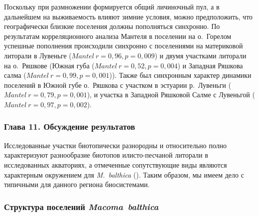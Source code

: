 {Поскольку при размножении формируется общий личиночный пул, а в дальнейшем на выживаемость влияют зимние условия, можно предположить, что географически близкие поселения должны пополняться синхронно.
По результатам корреляционного анализа Мантеля в поселении на о.~Горелом успешные пополнения происходили синхронно с поселениями на материковой литорали в Лувеньге ($Mantel\ r = 0,96, p = 0,009$) и двумя участками литорали на о.~Ряшкове (Южная губа ($Mantel\ r = 0,52, p = 0,004$) и Западная Ряшкова салма ($Mantel\ r = 0,99, p = 0,001$)).
Также был синхронным характер динамики поселений в Южной губе о.~Ряшкова с участком в эстуарии р.~Лувеньги ($Mantel\ r = 0,79, p = 0,001$), и участка в Западной Ряшковой Салме с Лувеньгой ($Mantel\ r = 0,97, p = 0,002$).

\subsubsection*{Глава 11. Обсуждение результатов}
Исследованные участки биотопически разнородны и относительно полно характеризуют разнообразие биотопов илисто-песчаной литорали в исследованных акваториях, а отмеченные сопутствующие виды являются характерным окружением для \textit{M.~balthica} (\cite{Derugin_1915, Guryanova_et_al_1928, Guryanova_Ushakov_1929, Guryanova_et_al_1930, Babkov_Golikov_1984, Naumov_Fedyakov_1993, Chertoprud_et_al_2004, Naumov_2006, Gerasimova_et_al_2010, Derevenschikov_Kravets_2010, Stolyarov_2010}). Таким образом, мы имеем дело с типичными для данного региона биосистемами.

\subsubsection*{Структура поселений \textit{Macoma~balthica}}
}
